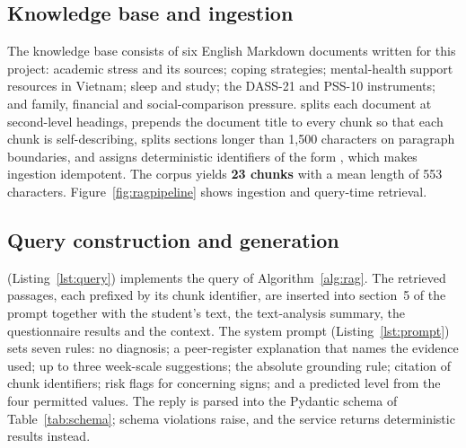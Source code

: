 \subsection{Knowledge base and ingestion}
The knowledge base consists of six English Markdown documents written for this project: academic stress and its sources; coping strategies; mental-health support resources in Vietnam; sleep and study; the DASS-21 and PSS-10 instruments; and family, financial and social-comparison pressure.  splits each document at second-level headings, prepends the document title to every chunk so that each chunk is self-describing, splits sections longer than 1,500 characters on paragraph boundaries, and assigns deterministic identifiers of the form , which makes ingestion idempotent. The corpus yields \textbf{23 chunks} with a mean length of 553 characters. Figure~\ref{fig:ragpipeline} shows ingestion and query-time retrieval.


\subsection{Query construction and generation}
 (Listing~\ref{lst:query}) implements the query of Algorithm~\ref{alg:rag}. The retrieved passages, each prefixed by its chunk identifier, are inserted into section~5 of the prompt together with the student's text, the text-analysis summary, the questionnaire results and the context. The system prompt (Listing~\ref{lst:prompt}) sets seven rules: no diagnosis; a peer-register explanation that names the evidence used; up to three week-scale suggestions; the absolute grounding rule; citation of chunk identifiers; risk flags for concerning signs; and a predicted level from the four permitted values. The reply is parsed into the Pydantic schema of Table~\ref{tab:schema}; schema violations raise, and the service returns deterministic results instead.

